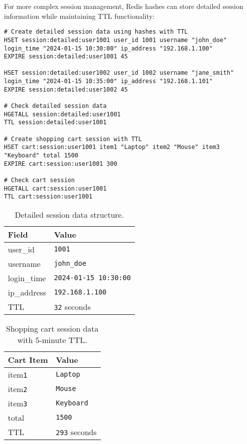 For more complex session management, Redis hashes can store detailed session information while maintaining TTL functionality:

\begin{verbatim}
# Create detailed session data using hashes with TTL
HSET session:detailed:user1001 user_id 1001 username "john_doe" login_time "2024-01-15 10:30:00" ip_address "192.168.1.100"
EXPIRE session:detailed:user1001 45

HSET session:detailed:user1002 user_id 1002 username "jane_smith" login_time "2024-01-15 10:35:00" ip_address "192.168.1.101"
EXPIRE session:detailed:user1002 45

# Check detailed session data
HGETALL session:detailed:user1001
TTL session:detailed:user1001

# Create shopping cart session with TTL
HSET cart:session:user1001 item1 "Laptop" item2 "Mouse" item3 "Keyboard" total 1500
EXPIRE cart:session:user1001 300

# Check cart session
HGETALL cart:session:user1001
TTL cart:session:user1001
\end{verbatim}

\begin{table}[H]
  \centering
  \begin{tabular}{|l|l|}
    \hline
    \textbf{Field} & \textbf{Value} \\
    \hline
    user\_id & \texttt{1001} \\
    username & \texttt{john\_doe} \\
    login\_time & \texttt{2024-01-15 10:30:00} \\
    ip\_address & \texttt{192.168.1.100} \\
    TTL & \texttt{32} seconds \\
    \hline
  \end{tabular}
  \caption{Detailed session data structure.}
\end{table}

\begin{table}[H]
  \centering
  \begin{tabular}{|l|l|}
    \hline
    \textbf{Cart Item} & \textbf{Value} \\
    \hline
    item\texttt{1} & \texttt{Laptop} \\
    item\texttt{2} & \texttt{Mouse} \\
    item\texttt{3} & \texttt{Keyboard} \\
    total & \texttt{1500} \\
    TTL & \texttt{293} seconds \\
    \hline
  \end{tabular}
  \caption{Shopping cart session data with 5-minute TTL.}
\end{table}

